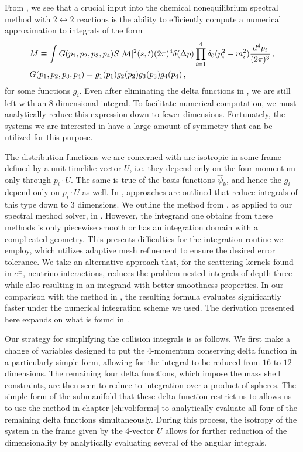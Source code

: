 From , we see that a crucial input into the chemical nonequilibrium spectral method with $2 \leftrightarrow 2$ reactions is the ability to efficiently compute a numerical approximation to integrals of the form
\begin{align}\label{coll:Ip}
&M\equiv\int G(p_1,p_2,p_3,p_4) S |\mathcal{M}|^2(s,t) (2\pi)^4\delta(\Delta p)\prod_{i=1}^4 \delta_0(p_i^2-m_i^2)\frac{d^4p_i}{(2\pi)^3}\,,\\
&G(p_1,p_2,p_3,p_4)=g_1(p_1)g_2(p_2)g_3(p_3)g_4(p_4)\,,\notag
\end{align}
for some functions $g_i$. Even after eliminating the delta functions in , we are still left with an $8$ dimensional integral.  To facilitate numerical computation, we must analytically reduce this expression down to fewer dimensions.  Fortunately, the systems we are interested in have a large amount of symmetry that  can be utilized for this purpose.  

The distribution functions we are concerned with are isotropic in some frame defined  by a unit timelike vector $U$, i.e. they depend only on the four-momentum only through $p_i\cdot U$.  The same is true of the basis functions $\hat\psi_k$, and hence the  $g_i$ depend only on $p_i\cdot U$ as well.  In \cite{Hannestad:1995rs,Dolgov:1997mb,Dolgov:1998sf}, approaches are outlined that reduce integrals of this type down to $3$ dimensions.  We outline the method from \cite{Dolgov:1997mb,Dolgov:1998sf}, as applied to our spectral method solver, in . However, the integrand one obtains from these methods is only piecewise smooth or has an integration domain with a complicated geometry.  This presents difficulties for the integration routine we employ, which utilizes adaptive mesh refinement to ensure the desired error tolerance.  We take an alternative approach that, for the scattering kernels found in $e^\pm$, neutrino interactions, reduces the problem nested integrals  of depth three while also resulting in an integrand with better smoothness properties.  In our comparison with the method in \cite{Dolgov:1997mb,Dolgov:1998sf}, the resulting formula evaluates significantly faster under the numerical integration scheme we used.   The derivation presented here expands on what is found in \cite{Letessier:2002ony}.

Our strategy for simplifying the collision integrals is as follows.  We first make a change of variables designed to put the 4-momentum conserving delta function in a particularly simple form, allowing for the integral to be reduced from $16$ to $12$ dimensions.  The remaining four delta functions, which impose the mass shell constraints, are then seen to reduce to integration over a product of spheres.  The simple form of the submanifold that these delta function restrict us to allows us to use the method in chapter \ref{ch:vol:forms} to analytically evaluate all four of the remaining delta functions simultaneously.  During this process, the isotropy of the system in the frame given by the 4-vector $U$ allows for further reduction of the dimensionality  by analytically evaluating several of the angular integrals. 

